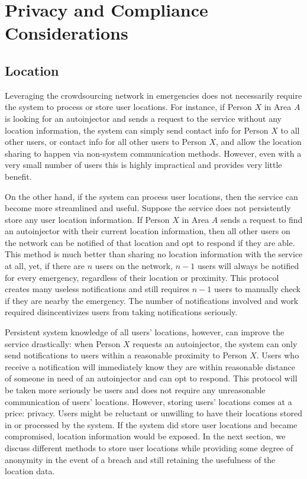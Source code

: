 \section{Privacy and Compliance Considerations} \label{location}

\onehalfspacing

\subsection{Location}

Leveraging the crowdsourcing network in emergencies does not necessarily require the system to process or store user locations. For instance, if Person $X$ in Area $A$ is looking for an autoinjector and sends a request to the service without any location information, the system can simply send contact info for Person $X$ to all other users, or contact info for all other users to Person $X$, and allow the location sharing to happen via non-system communication methods. However, even with a very small number of users this is highly impractical and provides very little benefit. 

On the other hand, if the system can process user locations, then the service can  become more streamlined and useful. Suppose the service does not persistently store any user location information. If Person $X$ in Area $A$ sends a request  to find an autoinjector with their current location information, then all other users on the network can be notified of that location and opt to respond if they are able. This method is much better than sharing no location information with the service at all, yet, if there are $n$ users on the network, $n-1$ users will always be notified for every emergency, regardless of their location or proximity. This protocol creates many useless notifications and still requires $n-1$ users to manually check if they are nearby the emergency. The number of notifications involved and work required disincentivizes users from taking notifications seriously.

Persistent system knowledge of all users' locations, however, can improve the service drastically: when Person $X$ requests an autoinjector, the system can only send notifications to users within a reasonable proximity to Person $X$. Users who receive a notification will immediately know they are within reasonable distance of someone in need of an autoinjector and can opt to respond. This protocol will be taken more seriously be users and does not require any unreasonable communication of users' locations. However, storing users' locations comes at a price: privacy. Users might be reluctant or unwilling to have their locations stored in or processed by the system. If the system did store user locations and became compromised, location information would be exposed. In the next section, we discuss different methods to store user locations while providing some degree of anonymity in the event of a breach and still retaining the usefulness of the location data.

